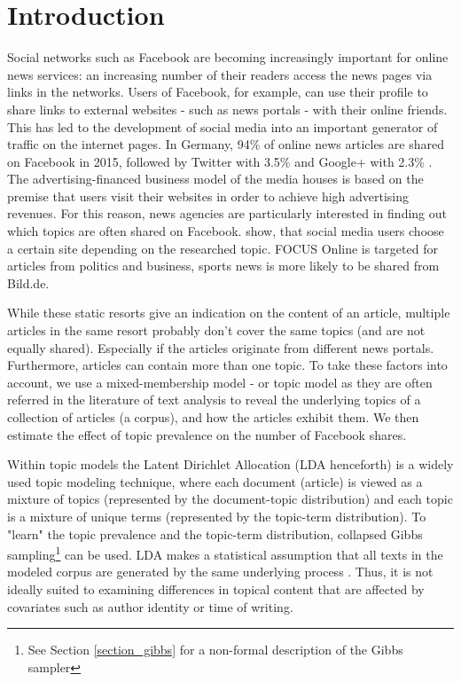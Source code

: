 \documentclass[12pt,a4paper,notitlepage]{article}
\begin{document}
\section{Introduction}

Social networks such as Facebook are becoming increasingly important for online news services: an increasing number of their readers access the news pages via links in the networks. Users of Facebook, for example, can use their profile to share links to external websites - such as news portals - with their online friends. This has led to the development of social media into an important generator of traffic on the internet pages. In Germany, 94\% of online news articles are shared on Facebook in 2015, followed by Twitter with 3.5\% and Google+ with 2.3\% \citep{schiller_development_2016}. The advertising-financed business model of the media houses is based on the premise that users visit their websites in order to achieve high advertising revenues. For this reason, news agencies are particularly interested in finding out which topics are often shared on Facebook. \citet{schiller_development_2016} show, that social media users choose a certain site depending on the researched topic. FOCUS Online is targeted for articles from politics and business, sports news is more likely to be shared from Bild.de. 

While these static resorts give an indication on the content of an article, multiple articles in the same resort probably don't cover the same topics (and are not equally shared). Especially if the articles originate from different news portals. Furthermore, articles can contain more than one topic. To take these factors into account, we use a mixed-membership model \citep{airoldi_handbook_2014} - or topic model as they are often referred in the literature of text analysis \citep{blei_probabilistic_2012} to reveal the underlying topics of a collection of articles (a corpus), and how the articles exhibit them. We then estimate the effect of topic prevalence on the number of Facebook shares.

Within topic models the Latent Dirichlet Allocation (LDA henceforth) is a widely used topic modeling technique, where each document (article) is viewed as a mixture of topics (represented by the document-topic distribution) and each topic is a mixture of unique terms (represented by the topic-term distribution). To "learn" the topic prevalence and the topic-term distribution, collapsed Gibbs sampling\footnote{See Section \ref{section_gibbs} for a non-formal description of the Gibbs sampler} can be used. LDA makes a statistical assumption that all texts in the modeled corpus are generated by the same underlying process \citep{blei_latent_2003}. Thus, it is not ideally suited to examining differences in topical content that are affected by covariates such as author identity or time of writing.
\end{document}
